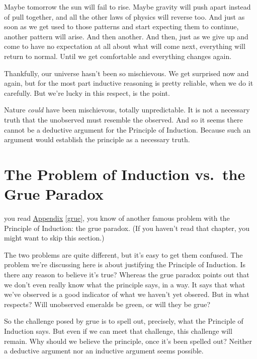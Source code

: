 \documentclass[justified]{tufte-book}
\begin{document}
Maybe tomorrow the sun will fail to rise. Maybe gravity will push apart instead of pull together, and all the other laws of physics will reverse too. And just as soon as we get used to those patterns and start expecting them to continue, another pattern will arise. And then another. And then, just as we give up and come to have no expectation at all about what will come next, everything will return to normal. Until we get comfortable and everything changes again.

Thankfully, our universe hasn't been so mischievous. We get surprised now and again, but for the most part inductive reasoning is pretty reliable, when we do it carefully. But we're lucky in this respect, is the point.

Nature \emph{could} have been mischievous, totally unpredictable. It is not a necessary truth that the unobserved must resemble the observed. And so it seems there cannot be a deductive argument for the Principle of Induction. Because such an argument would establish the principle as a necessary truth.

\hypertarget{the-problem-of-induction-vs.the-grue-paradox}{%
\section*{The Problem of Induction vs.~the Grue Paradox}\label{the-problem-of-induction-vs.the-grue-paradox}}

 you read \protect\hyperlink{grue}{Appendix} \ref{grue}, you know of another famous problem with the Principle of Induction: the grue paradox. (If you haven't read that chapter, you might want to skip this section.)

The two problems are quite different, but it's easy to get them confused. The problem we're discussing here is about justifying the Principle of Induction. Is there any reason to believe it's true? Whereas the grue paradox points out that we don't even really know what the principle says, in a way. It says that what we've observed is a good indicator of what we haven't yet obsered. But in what respects? Will unobserved emeralds be green, or will they be grue?

So the challenge posed by grue is to spell out, precisely, what the Principle of Induction says. But even if we can meet that challenge, this challenge will remain. Why should we believe the principle, once it's been spelled out? Neither a deductive argument nor an inductive argument seems possible.
\end{document}
